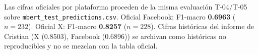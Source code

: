 Las cifras oficiales por plataforma proceden de la misma evaluación T-04/T-05 sobre \texttt{mbert\_test\_predictions.csv}.
Oficial Facebook: F1-macro \textbf{0.6963} ($n=232$).
Oficial X: F1-macro \textbf{0.8257} ($n=228$).
Cifras históricas del informe de Cristian (X (0.8503), Facebook (0.6896)) se archivan como históricas no reproducibles y no se mezclan con la tabla oficial.
